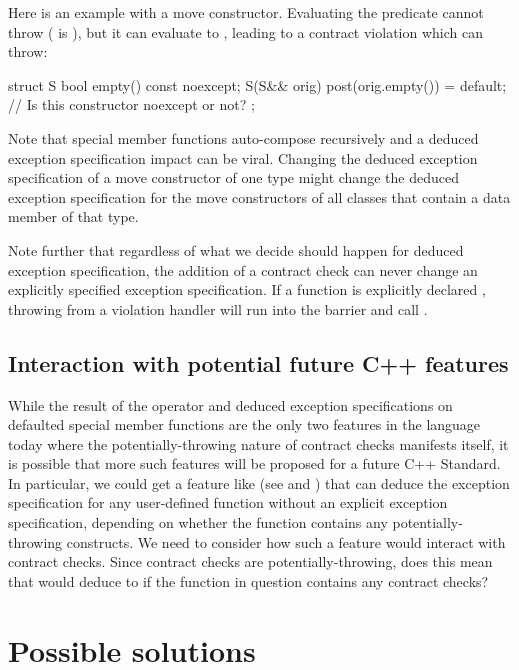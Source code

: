 Here is an example with a move constructor. Evaluating the predicate cannot throw ( is ), but it can evaluate to , leading to a contract violation which can throw:

\begin{codeblock}
struct S {
  bool empty() const noexcept;
  S(S&& orig) post(orig.empty()) = default;  // Is this constructor noexcept or not?
};
\end{codeblock}

Note that special member functions auto-compose recursively and a deduced exception specification impact can be viral. Changing the deduced exception specification of a move constructor of one type might change the deduced exception specification for the move constructors of all classes that contain a data member of that type.

Note further that regardless of what we decide should happen for deduced exception specification, the addition of a contract check can never change an explicitly specified exception specification. If a function is explicitly declared , throwing from a violation handler will run into the  barrier and call .

\subsection{Interaction with potential future C++ features}

While the result of the  operator and deduced exception specifications on defaulted special member functions are the only two features in the language today where the potentially-throwing nature of contract checks manifests itself, it is possible that more such features will be proposed for a future C++ Standard. In particular, we could get a feature like  (see \cite{N4473} and \cite{P0133R0}) that can deduce the exception specification for any user-defined function without an explicit exception specification, depending on whether the function contains any potentially-throwing constructs. We need to consider how such a feature would interact with contract checks. Since contract checks are potentially-throwing, does this mean that  would deduce to  if the function in question contains any contract checks?

\section{Possible solutions}


